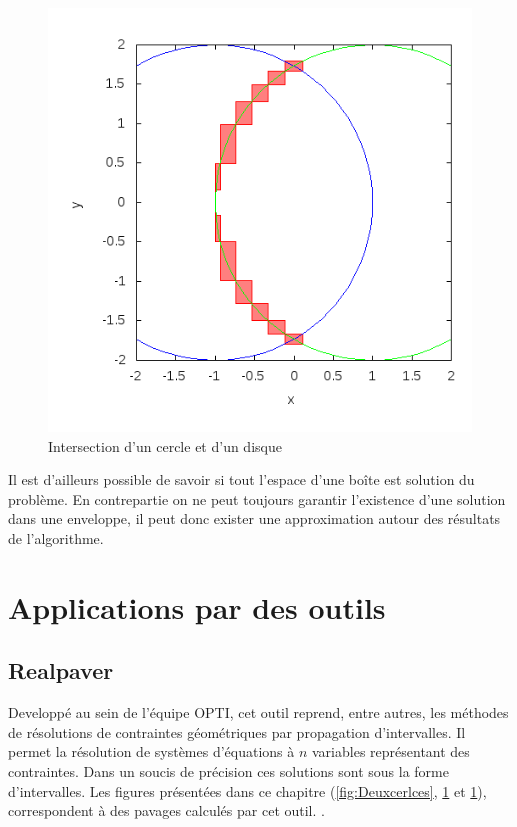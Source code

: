 \begin{figure}[h!] %
  \center
\includegraphics[scale=0.5]{img/circle-disk}
  \caption{Intersection d'un cercle et d'un disque} %
 \label{fig:CercleDisque} %
\end{figure} %

 Il est d'ailleurs possible de savoir si tout l'espace d'une boîte est solution du problème. En contrepartie on ne peut toujours garantir l'existence d'une solution dans une enveloppe, il peut donc exister une approximation autour des résultats de l'algorithme.

\clearpage
 
 \section{Applications par des outils}
\subsection{Realpaver}\label{realp}
Developpé  au sein de l'équipe \textsc{OPTI}, cet outil reprend, entre autres, les méthodes de résolutions de contraintes géométriques par propagation d'intervalles. Il permet la résolution de systèmes d'équations à $n$ variables représentant des contraintes. Dans un soucis de précision ces solutions sont sous la forme d'intervalles. Les figures présentées dans ce chapitre (\ref{fig:Deuxcerlces}, \ref{fig:CercleDisque} et \ref{fig:CercleDisque}), correspondent à des pavages calculés par cet outil. \cite{realpaver}.
